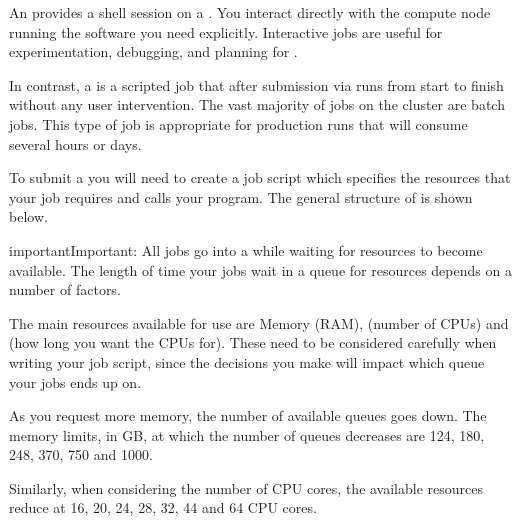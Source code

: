 \documentclass[letterpaper,10pt,english]{sphinxmanual}
\begin{document}
An  provides a shell session on a {\hyperref[\detokenize{glossary:term-Compute-Nodes}]{}}. You interact directly with the compute node running the software you need explicitly. Interactive jobs are useful for experimentation, debugging, and planning for .

In contrast, a {\hyperref[\detokenize{glossary:term-Batch-Job}]{}} is a scripted job that \sphinxhyphen{} after submission via  \sphinxhyphen{} runs from start to finish without any user intervention. The vast majority of jobs on the cluster are batch jobs. This type of job is appropriate for production runs that will consume several hours or days.

To submit a {\hyperref[\detokenize{glossary:term-Batch-Job}]{}} you will need to create a job script which specifies the resources that your job requires and calls your program. The general structure of {\hyperref[\detokenize{using_katana/running_jobs:a-job-script}]{}} is shown below.

\begin{sphinxadmonition}{important}{Important:}
All jobs go into a {\hyperref[\detokenize{glossary:term-Queue}]{}} while waiting for resources to become available. The length of time your jobs wait in a queue for resources depends on a number of factors.
\end{sphinxadmonition}

The main resources available for use are Memory (RAM), {\hyperref[\detokenize{glossary:term-CPU-Core}]{}} (number of CPUs) and {\hyperref[\detokenize{glossary:term-Walltime}]{}} (how long you want the CPUs for). These need to be considered carefully when writing your job script, since the decisions you make will impact which queue your jobs ends up on.

As you request more memory, the number of available queues goes down. The memory limits, in GB, at which the number of queues decreases are 124, 180, 248, 370, 750 and 1000.

Similarly, when considering the number of CPU cores, the available resources reduce at 16, 20, 24, 28, 32, 44 and 64 CPU cores.
\end{document}
